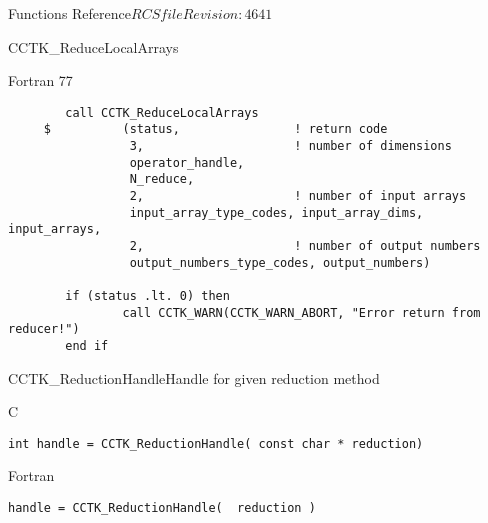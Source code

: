 \begin{cactuspart}{ Functions Reference}{$RCSfile$}{$Revision: 4641 $}
\begin{FunctionDescription}{CCTK\_ReduceLocalArrays}
\begin{ExampleSection}
\begin{Example}{Fortran 77}
\begin{verbatim}
        call CCTK_ReduceLocalArrays
     $          (status,                ! return code
                 3,                     ! number of dimensions
                 operator_handle,
                 N_reduce,
                 2,                     ! number of input arrays
                 input_array_type_codes, input_array_dims, input_arrays,
                 2,                     ! number of output numbers
                 output_numbers_type_codes, output_numbers)

        if (status .lt. 0) then
                call CCTK_WARN(CCTK_WARN_ABORT, "Error return from reducer!")
        end if

\end{verbatim}
\end{Example}
\end{ExampleSection}
\end{FunctionDescription}



\begin{FunctionDescription}{CCTK\_ReductionHandle}{Handle for given reduction method}
\label{CCTK-ReductionHandle}
\begin{SynopsisSection}
\begin{Synopsis}{C}
\begin{verbatim}int handle = CCTK_ReductionHandle( const char * reduction)\end{verbatim}
\end{Synopsis}
\begin{Synopsis}{Fortran}
\begin{verbatim}handle = CCTK_ReductionHandle(  reduction )


\end{verbatim}
\end{Synopsis}
\end{SynopsisSection}
\end{FunctionDescription}
\end{cactuspart}
